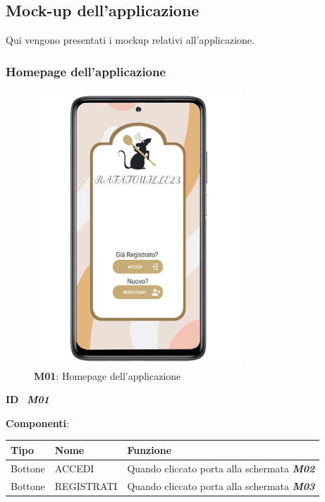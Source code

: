 \subsection{Mock-up dell'applicazione}
    \begin{flushleft}
        Qui vengono presentati i mockup relativi all'applicazione.
    \end{flushleft}
    \subsubsection{Homepage dell'applicazione}
        \begin{figure}[H]
            \centering
            \includegraphics[width=0.70\textwidth]{assets/Mockup/Mockup_Homepage.png}
            \caption{\textbf{M01}: Homepage dell'applicazione}
            \label{fig:Mockup_Homepage}
        \end{figure}
        \begin{flushleft}
            \textbf{ID} \ \Large{\textit{\textbf{M01}}}\\
        \end{flushleft}
        \textbf{Componenti}:\\
        \begin{tabular}{lll}
            \hline
            \textbf{Tipo}   &   \textbf{Nome}   &   \textbf{Funzione} \\
            \hline
            Bottone       &   ACCEDI &   Quando cliccato porta alla schermata \textit{\textbf{M02}} \\
            \hline
            Bottone & REGISTRATI   &   Quando cliccato porta alla schermata \textit{\textbf{M03}} \\
            \hline
        \end{tabular}
        \newpage
